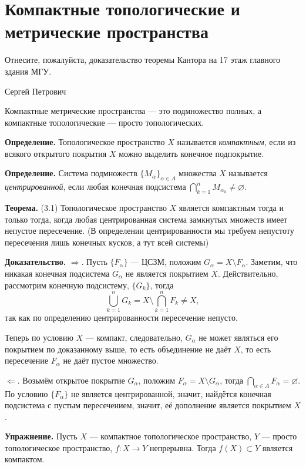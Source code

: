 \section{Компактные топологические и метрические пространства}
\epigraph{
Отнесите, пожалуйста, доказательство теоремы Кантора на 17 этаж главного здания МГУ.
}{Сергей Петрович}

Компактные метрические пространства --- это подмножество полных, а компактные топологические --- просто топологических.

\textbf{Определение.} Топологическое пространство $X$ называется \textit{компактным}, если из всякого открытого покрытия $X$ можно выделить конечное подпокрытие.

\textbf{Определение.} Система подмножеств $\{M_\alpha\}_{\alpha \in A}$ множества $X$ называется \textit{центрированной}, если любая конечная подсистема $\bigcap_{k=1}^n M_{\alpha_k} \ne \varnothing$.

\textbf{Теорема.} (3.1) Топологическое пространство $X$ является компактным тогда и только тогда, когда любая центрированная система замкнутых множеств имеет непустое пересечение.
(В определении центрированности мы требуем непустоту пересечения лишь конечных кусков, а тут всей системы)

\textbf{Доказательство.} $\Rightarrow$. Пусть $\{F_\alpha\}$ --- ЦСЗМ, положим $G_\alpha = X \setminus F_\alpha$.
Заметим, что никакая конечная подсистема $G_\alpha$ не является покрытием $X$.
Действительно, рассмотрим конечную подсистему, $\{G_k\}$, тогда
\[
    \bigcup_{k=1}^n G_k = X \setminus \bigcap_{k=1}^n F_k \ne X,
\]
так как по определению центрированности пересечение непусто.

Теперь по условию $X$ --- компакт, следовательно, $G_\alpha$ не может являться его покрытием по доказанному выше, то есть объединение не даёт $X$, то есть пересечение $F_\alpha$ не даёт пустое множество.

$\Leftarrow$. Возьмём открытое покрытие $G_\alpha$, положим $F_\alpha = X \setminus G_\alpha$, тогда $\bigcap_{\alpha \in A} F_\alpha = \varnothing$.
По условию $\{F_\alpha\}$ не является центрированной, значит, найдётся конечная подсистема с пустым пересечением, значит, её дополнение является покрытием $X$.

\QED

\textbf{Упражнение.} Пусть $X$ --- компактное топологическое пространство, $Y$ --- просто топологическое пространство, $f: X \to Y$ непрерывна.
Тогда $f(X) \subset Y$ является компактом.

